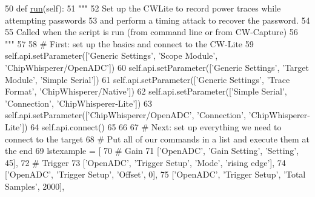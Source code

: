 \begin{DoxyCode}
50     \textcolor{keyword}{def }\hyperlink{classsoftware_1_1chipwhisperer_1_1capture_1_1scripts_1_1cwlite-timingattack_1_1UserScript_aa16c2b2a310537131e46e494a5063716}{run}(self):
51         \textcolor{stringliteral}{"""}
52 \textcolor{stringliteral}{        Set up the CWLite to record power traces while attempting passwords}
53 \textcolor{stringliteral}{        and perform a timing attack to recover the password.}
54 \textcolor{stringliteral}{        }
55 \textcolor{stringliteral}{        Called when the script is run (from command line or from CW-Capture)}
56 \textcolor{stringliteral}{        """}
57         
58         \textcolor{comment}{# First: set up the basics and connect to the CW-Lite}
59         self.api.setParameter([\textcolor{stringliteral}{'Generic Settings'}, \textcolor{stringliteral}{'Scope Module'}, \textcolor{stringliteral}{'ChipWhisperer/OpenADC'}])
60         self.api.setParameter([\textcolor{stringliteral}{'Generic Settings'}, \textcolor{stringliteral}{'Target Module'}, \textcolor{stringliteral}{'Simple Serial'}])
61         self.api.setParameter([\textcolor{stringliteral}{'Generic Settings'}, \textcolor{stringliteral}{'Trace Format'}, \textcolor{stringliteral}{'ChipWhisperer/Native'}])
62         self.api.setParameter([\textcolor{stringliteral}{'Simple Serial'}, \textcolor{stringliteral}{'Connection'}, \textcolor{stringliteral}{'ChipWhisperer-Lite'}])
63         self.api.setParameter([\textcolor{stringliteral}{'ChipWhisperer/OpenADC'}, \textcolor{stringliteral}{'Connection'}, \textcolor{stringliteral}{'ChipWhisperer-Lite'}])
64         self.api.connect()
65         
66         
67         \textcolor{comment}{# Next: set up everything we need to connect to the target}
68         \textcolor{comment}{# Put all of our commands in a list and execute them at the end}
69         lstexample = [
70                       \textcolor{comment}{# Gain}
71                       [\textcolor{stringliteral}{'OpenADC'}, \textcolor{stringliteral}{'Gain Setting'}, \textcolor{stringliteral}{'Setting'}, 45],
72                       \textcolor{comment}{# Trigger}
73                       [\textcolor{stringliteral}{'OpenADC'}, \textcolor{stringliteral}{'Trigger Setup'}, \textcolor{stringliteral}{'Mode'}, \textcolor{stringliteral}{'rising edge'}],
74                       [\textcolor{stringliteral}{'OpenADC'}, \textcolor{stringliteral}{'Trigger Setup'}, \textcolor{stringliteral}{'Offset'}, 0],
75                       [\textcolor{stringliteral}{'OpenADC'}, \textcolor{stringliteral}{'Trigger Setup'}, \textcolor{stringliteral}{'Total Samples'}, 2000],

\end{DoxyCode}
